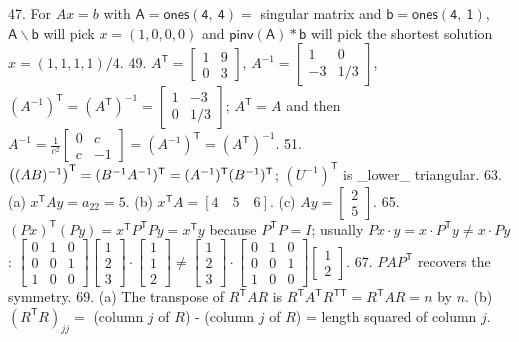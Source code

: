 47. For \(Ax=b\) with \(\mathsf{A}=\mathsf{ones(4,\ 4)}=\) singular matrix and \(\mathsf{b}=\mathsf{ones(4,\ 1)}\), \(\mathsf{A\backslash b}\) will pick \(x=(1,0,0,0)\) and \(\mathsf{pinv(A)*b}\) will pick the shortest solution \(x=(1,1,1,1)/4\).
49. \(A^{\mathsf{T}}=\begin{bmatrix}1&9\\ 0&3\end{bmatrix}\), \(A^{-1}=\begin{bmatrix}1&0\\ -3&1/3\end{bmatrix}\), \((A^{-1})^{\mathsf{T}}=(A^{\mathsf{T}})^{-1}=\begin{bmatrix}1&-3\\ 0&1/3\end{bmatrix}\); \(A^{\mathsf{T}}=A\) and then \(A^{-1}=\frac{1}{c^{2}}\begin{bmatrix}0&c\\ c&-1\end{bmatrix}=(A^{-1})^{\mathsf{T}}=(A^{\mathsf{T}})^{-1}\).
51. \(\big{(}(AB)^{-1}\big{)}^{\mathsf{T}}=(B^{-1}A^{-1})^{\mathsf{T}}=(A^{-1})^{ \mathsf{T}}(B^{-1})^{\mathsf{T}}\); \((U^{-1})^{\mathsf{T}}\) is _lower_ triangular.
63. (a) \(x^{\mathsf{T}}Ay=a_{22}=5\). (b) \(x^{\mathsf{T}}A=[4\quad 5\quad 6]\). (c) \(Ay=\begin{bmatrix}2\\ 5\end{bmatrix}\).
65. \((Px)^{\mathsf{T}}(Py)=x^{\mathsf{T}}P^{\mathsf{T}}Py=x^{\mathsf{T}}y\) because \(P^{\mathsf{T}}P=I\); usually \(Px\cdot y=x\cdot P^{\mathsf{T}}y\neq x\cdot Py\): \(\begin{bmatrix}0&1&0\\ 0&0&1\\ 1&0&0\end{bmatrix}\)\(\begin{bmatrix}1\\ 2\\ 3\end{bmatrix}\cdot\begin{bmatrix}1\\ 1\\ 2\end{bmatrix}\neq\begin{bmatrix}1\\ 2\\ 3\end{bmatrix}\cdot\begin{bmatrix}0&1&0\\ 0&0&1\\ 1&0&0\end{bmatrix}\)\(\begin{bmatrix}1\\ 2\end{bmatrix}\).
67. \(PAP^{\mathsf{T}}\) recovers the symmetry.
69. (a) The transpose of \(R^{\mathsf{T}}AR\) is \(R^{\mathsf{T}}A^{\mathsf{T}}R^{\mathsf{TT}}=R^{\mathsf{T}}AR=n\) by \(n\). (b) \((R^{\mathsf{T}}R)_{jj}=\) (column \(j\) of \(R\)) - (column \(j\) of \(R\)) = length squared of column \(j\).

 